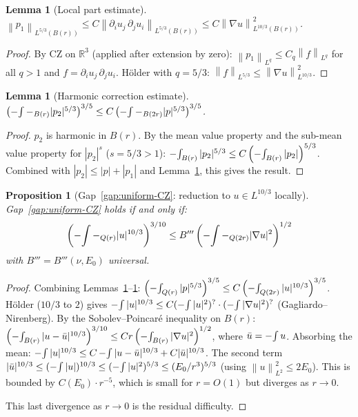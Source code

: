 \documentclass[11pt]{article}
\newtheorem{proposition}[theorem]{Proposition}
\newtheorem{lemma}[theorem]{Lemma}
\theoremstyle{definition}
\theoremstyle{remark}
\newcommand{\R}{\mathbb{R}}
\newcommand{\norm}[1]{\left\|#1\right\|}
\newcommand{\grad}{\nabla}
\newcommand{\Xint}{\mathop{\mathchoice{\vcenter{\hbox{$\displaystyle-$}}}%
  {\vcenter{\hbox{$\textstyle-$}}}%
  {\vcenter{\hbox{$\scriptstyle-$}}}%
  {\vcenter{\hbox{$\scriptscriptstyle-$}}}}\!\int}
\begin{document}
\begin{lemma}[Local part estimate]\label{lem:p1}
  $\norm{p_1}_{L^{5/3}(B(r))}\leq C\norm{\partial_i u_j\,\partial_j u_i}_{L^{5/3}(B(r))}
  \leq C\norm{\grad u}^2_{L^{10/3}(B(r))}$.
\end{lemma}

\begin{proof}
  By CZ on $\R^3$ (applied after extension by zero): $\norm{p_1}_{L^q}\leq C_q\norm{f}_{L^q}$
  for all $q>1$ and $f=\partial_i u_j\,\partial_j u_i$.  H\"older with $q=5/3$:
  $\norm{f}_{L^{5/3}}\leq\norm{\grad u}^2_{L^{10/3}}$.
\end{proof}

\begin{lemma}[Harmonic correction estimate]\label{lem:p2}
  $\left(\Xint-_{B(r)}|p_2|^{5/3}\right)^{3/5}\leq C\left(\Xint-_{B(2r)}|p|^{5/3}\right)^{3/5}$.
\end{lemma}

\begin{proof}
  $p_2$ is harmonic in $B(r)$.  By the mean value property and the sub-mean
  value property for $|p_2|^s$ ($s=5/3>1$):
  $\Xint_{B(r)}|p_2|^{5/3}\leq C\left(\Xint_{B(r)}|p_2|\right)^{5/3}$.
  Combined with $|p_2|\leq|p|+|p_1|$ and Lemma~\ref{lem:p1}, this gives
  the result.
\end{proof}

\begin{proposition}[Gap~\ref{gap:uniform-CZ}: reduction to $u\in L^{10/3}$ locally]\label{prop:gap-reduction}
  Gap~\ref{gap:uniform-CZ} holds if and only if:
  \begin{equation}\label{eq:L103-local}
    \left(\Xint-_{Q(r)}|u|^{10/3}\right)^{3/10}
    \leq B'''\left(\Xint-_{Q(2r)}|\grad u|^2\right)^{1/2}
  \end{equation}
  with $B'''=B'''(\nu,E_0)$ universal.
\end{proposition}

\begin{proof}
  Combining Lemmas~\ref{lem:p1}--\ref{lem:p2}:
  $\left(\Xint_{Q(r)}|p|^{5/3}\right)^{3/5}
  \leq C\left(\Xint_{Q(2r)}|u|^{10/3}\right)^{3/5}$.
  H\"older ($10/3$ to $2$) gives $\Xint|u|^{10/3}\leq C(\Xint|u|^2)^{?}
  \cdot(\Xint|\grad u|^2)^{?}$ (Gagliardo--Nirenberg).
  By the Sobolev--Poincar\'e inequality on $B(r)$:
  $\left(\Xint_{B(r)}|u-\bar u|^{10/3}\right)^{3/10}\leq Cr\left(\Xint_{B(r)}|\grad u|^2\right)^{1/2}$,
  where $\bar u = \Xint u$.  Absorbing the mean:
  $\Xint|u|^{10/3}\leq C\Xint|u-\bar u|^{10/3}+C|\bar u|^{10/3}$.
  The second term $|\bar u|^{10/3}\leq(\Xint|u|)^{10/3}\leq(\Xint|u|^2)^{5/3}
  \leq(E_0/r^3)^{5/3}$ (using $\norm{u}^2_{L^2}\leq 2E_0$).
  This is bounded by $C(E_0)\cdot r^{-5}$, which is small for $r=O(1)$
  but diverges as $r\to 0$.

  This last divergence as $r\to 0$ is the residual difficulty.
\end{proof}
\end{document}
